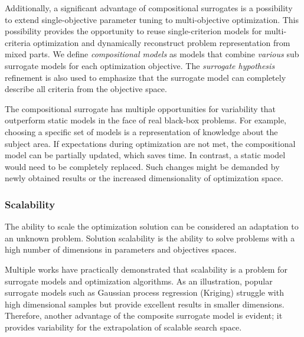             Additionally, a significant advantage of compositional surrogates is a possibility to extend single-objective parameter tuning to multi-objective optimization. This possibility provides the opportunity to reuse single-criterion models for multi-criteria optimization and dynamically reconstruct problem representation from mixed parts.
            We define \emph{compositional models} as models that combine \emph{various} sub surrogate models for each optimization objective. The \emph{surrogate hypothesis} refinement is also used to emphasize that the surrogate model can completely describe all criteria from the objective space.

            The compositional surrogate has multiple opportunities for variability that outperform static models in the face of real black-box problems. For example, choosing a specific set of models is a representation of knowledge about the subject area. If expectations during optimization are not met, the compositional model can be partially updated, which saves time. In contrast, a static model would need to be completely replaced. Such changes might be demanded by newly obtained results or the increased dimensionality of optimization space.

            \subsubsection{Scalability}
            The ability to scale the optimization solution can be considered an adaptation to an unknown problem. Solution scalability is the ability to solve problems with a high number of dimensions in parameters and objectives spaces.

            Multiple works\cite{KrallMD15, SpringenbergKFH16} have practically demonstrated that scalability is a problem for surrogate models and optimization algorithms. As an illustration, popular surrogate models such as Gaussian process regression (Kriging) \cite{JonesSW98} struggle with high dimensional samples but provide excellent results in smaller dimensions. Therefore, another advantage of the composite surrogate model is evident; it provides variability for the extrapolation of scalable search space.

